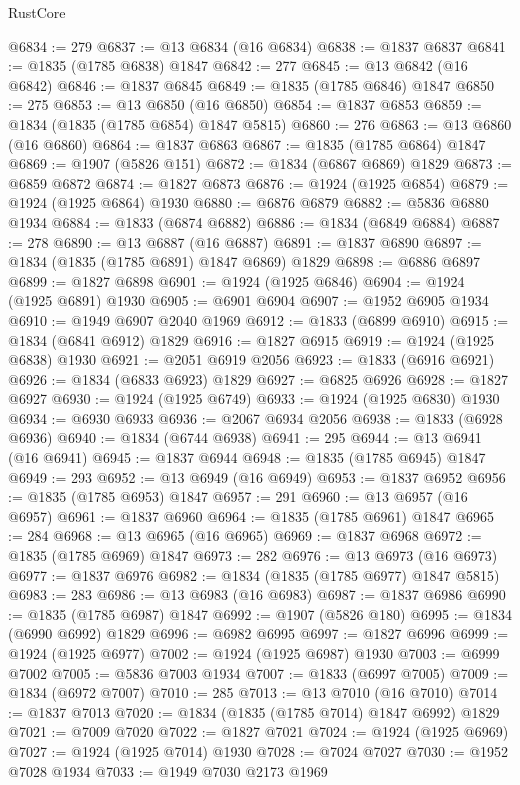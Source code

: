 \begin{lexlean}{RustCore}
\begin{coremodule}
@6834 := 279
@6837 := @13 @6834 (@16 @6834)
@6838 := @1837 @6837
@6841 := @1835 (@1785 @6838) @1847
@6842 := 277
@6845 := @13 @6842 (@16 @6842)
@6846 := @1837 @6845
@6849 := @1835 (@1785 @6846) @1847
@6850 := 275
@6853 := @13 @6850 (@16 @6850)
@6854 := @1837 @6853
@6859 := @1834 (@1835 (@1785 @6854) @1847 @5815)
@6860 := 276
@6863 := @13 @6860 (@16 @6860)
@6864 := @1837 @6863
@6867 := @1835 (@1785 @6864) @1847
@6869 := @1907 (@5826 @151)
@6872 := @1834 (@6867 @6869) @1829
@6873 := @6859 @6872
@6874 := @1827 @6873
@6876 := @1924 (@1925 @6854)
@6879 := @1924 (@1925 @6864) @1930
@6880 := @6876 @6879
@6882 := @5836 @6880 @1934
@6884 := @1833 (@6874 @6882)
@6886 := @1834 (@6849 @6884)
@6887 := 278
@6890 := @13 @6887 (@16 @6887)
@6891 := @1837 @6890
@6897 := @1834 (@1835 (@1785 @6891) @1847 @6869) @1829
@6898 := @6886 @6897
@6899 := @1827 @6898
@6901 := @1924 (@1925 @6846)
@6904 := @1924 (@1925 @6891) @1930
@6905 := @6901 @6904
@6907 := @1952 @6905 @1934
@6910 := @1949 @6907 @2040 @1969
@6912 := @1833 (@6899 @6910)
@6915 := @1834 (@6841 @6912) @1829
@6916 := @1827 @6915
@6919 := @1924 (@1925 @6838) @1930
@6921 := @2051 @6919 @2056
@6923 := @1833 (@6916 @6921)
@6926 := @1834 (@6833 @6923) @1829
@6927 := @6825 @6926
@6928 := @1827 @6927
@6930 := @1924 (@1925 @6749)
@6933 := @1924 (@1925 @6830) @1930
@6934 := @6930 @6933
@6936 := @2067 @6934 @2056
@6938 := @1833 (@6928 @6936)
@6940 := @1834 (@6744 @6938)
@6941 := 295
@6944 := @13 @6941 (@16 @6941)
@6945 := @1837 @6944
@6948 := @1835 (@1785 @6945) @1847
@6949 := 293
@6952 := @13 @6949 (@16 @6949)
@6953 := @1837 @6952
@6956 := @1835 (@1785 @6953) @1847
@6957 := 291
@6960 := @13 @6957 (@16 @6957)
@6961 := @1837 @6960
@6964 := @1835 (@1785 @6961) @1847
@6965 := 284
@6968 := @13 @6965 (@16 @6965)
@6969 := @1837 @6968
@6972 := @1835 (@1785 @6969) @1847
@6973 := 282
@6976 := @13 @6973 (@16 @6973)
@6977 := @1837 @6976
@6982 := @1834 (@1835 (@1785 @6977) @1847 @5815)
@6983 := 283
@6986 := @13 @6983 (@16 @6983)
@6987 := @1837 @6986
@6990 := @1835 (@1785 @6987) @1847
@6992 := @1907 (@5826 @180)
@6995 := @1834 (@6990 @6992) @1829
@6996 := @6982 @6995
@6997 := @1827 @6996
@6999 := @1924 (@1925 @6977)
@7002 := @1924 (@1925 @6987) @1930
@7003 := @6999 @7002
@7005 := @5836 @7003 @1934
@7007 := @1833 (@6997 @7005)
@7009 := @1834 (@6972 @7007)
@7010 := 285
@7013 := @13 @7010 (@16 @7010)
@7014 := @1837 @7013
@7020 := @1834 (@1835 (@1785 @7014) @1847 @6992) @1829
@7021 := @7009 @7020
@7022 := @1827 @7021
@7024 := @1924 (@1925 @6969)
@7027 := @1924 (@1925 @7014) @1930
@7028 := @7024 @7027
@7030 := @1952 @7028 @1934
@7033 := @1949 @7030 @2173 @1969

\end{coremodule}
\end{lexlean}
